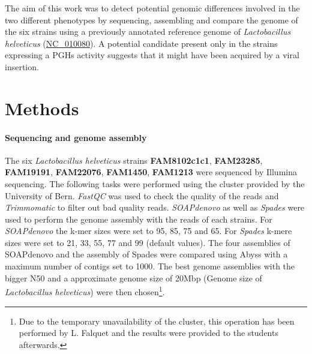 \documentclass[10pt,a4paper]{article}
\begin{document}
The aim of this work was to detect potential genomic differences involved in the two different phenotypes by sequencing, assembling and compare the genome of the six strains using a previously annotated reference genome of \textit{Lactobacillus helveticus} (\href{https://www.ncbi.nlm.nih.gov/genome/?term=NC_010080}{NC\_010080}). A potential candidate present only in the strains expressing a PGHs activity suggests that it might have been acquired by a viral insertion. 

  


\section*{Methods}

\paragraph{Sequencing and genome assembly}
The six \textit{Lactobacillus helveticus} strains \textbf{FAM8102c1c1}, \textbf{FAM23285}, \textbf{FAM19191}, \textbf{FAM22076}, \textbf{FAM1450}, \textbf{FAM1213}  were sequenced by Illumina sequencing. The following tasks were performed using the cluster provided by the University of Bern.  \textit{FastQC}\cite{andrews2012} was used to check the quality of the reads and \textit{Trimmomatic}\cite{bolger_trimmomatic:_2014} to filter out bad quality reads. \textit{SOAPdenovo} as well as \textit{Spades} were used to perform the genome assembly with the reads of each strains. For \textit{SOAPdenovo} the k-mer sizes were set to 95, 85, 75 and 65. For \textit{Spades} k-mere sizes were set to 21, 33, 55, 77 and 99 (default values). The four assemblies of SOAPdenovo and the assembly of Spades were compared using Abyss with a maximum number of contigs set to 1000. The best genome assemblies with the bigger N50 and a approximate genome size of 20Mbp (Genome size of \textit{Lactobacillus helveticus}) were then chosen\footnote{Due to the temporary unavailability of the cluster, this operation has been performed by L. Falquet and the results were provided to the students afterwards.}.
\end{document}

